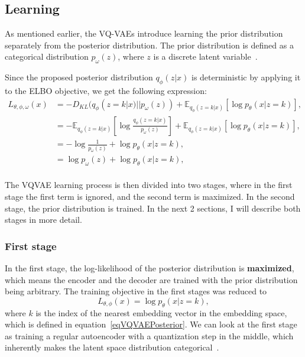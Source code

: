 \subsection{Learning}

As mentioned earlier, the VQ-VAEs introduce learning the prior distribution separately from the posterior distribution. The prior distribution is defined as a categorical distribution $p_{\omega}(z)$, where $z$ is a discrete latent variable~\cite{vqvae}.

Since the proposed posterior distribution $q_{\phi}(z|x)$ is deterministic by applying it to the ELBO objective, we get the following expression:
\begin{equation}
    \begin{split}
        L_{\theta, \phi, \omega}(x) &= - D_{KL}(q_{\phi}(z = k|x) || p_{\omega}(z)) + \mathbb{E}_{q_{\phi}(z=k|x)} [\log p_{\theta}(x|z = k)],\\
                            &= - \mathbb{E}_{q_{\phi}(z=k|x)} [\log \frac{q_{\phi}(z=k|x)}{p_{\omega}(z)}] + \mathbb{E}_{q_{\phi}(z=k|x)} [\log p_{\theta}(x|z = k)],\\
                            &= - \log \frac{1}{p_{\omega}(z)} + \log p_{\theta}(x|z = k),\\
                            &= \log p_{\omega}(z) + \log p_{\theta}(x|z = k),\\
    \end{split}
\end{equation}

The VQVAE learning process is then divided into two stages, where in the first stage the first term is ignored, and the second term is maximized. In the second stage, the prior distribution is trained. In the next 2 sections, I will describe both stages in more detail.

\subsubsection{First stage}

In the first stage, the log-likelihood of the posterior distribution is \textbf{maximized}, which means the encoder and the decoder are trained with the prior distribution being arbitrary. The training objective in the first stages was reduced to 
\[ L_{\theta, \phi}(x) = \log p_{\theta}(x|z = k), \]
where $k$ is the index of the nearest embedding vector in the embedding space, which is defined in equation~\ref{eqVQVAEPosterior}. We can look at the first stage as training a regular autoencoder with a quantization step in the middle, which inherently makes the latent space distribution categorical~\cite{vqvae}.
    
